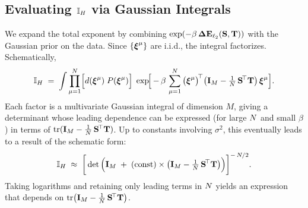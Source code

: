 \documentclass[11pt]{article}
\begin{document}
\subsection{Evaluating \(\mathbb{I}_{H}\) via Gaussian Integrals}
We expand the total exponent by combining \(\exp(-\beta\,\mathbf{\Delta {E}}_{\ell_2}({\mathbf{S}},{\mathbf{T}}))\) with the Gaussian prior on the data. Since \(\{\boldsymbol{\xi}^\mu\}\) are i.i.d., the integral factorizes. Schematically,
\begin{equation}
\mathbb{I}_{H} \;=\;
\int
\prod_{\mu=1}^{N}
\Bigl[
d(\boldsymbol{\xi}^\mu)\;P(\boldsymbol{\xi}^\mu)
\Bigr]\;
\exp\!\Bigl[\, -\,\beta\,\sum_{\mu=1}^{N}\,\bigl(\boldsymbol{\xi}^\mu\bigr)^{\!\top}
\bigl(\mathbf{I}_{M}-\tfrac{1}{N}\,{\mathbf{S}}^{\!\top}{\mathbf{T}}\bigr)
\,\boldsymbol{\xi}^\mu
\Bigr].
\label{eqn:IH_expanded}
\end{equation}
Each factor is a multivariate Gaussian integral of dimension \(M\), giving a determinant whose leading dependence can be expressed (for large \(N\) and small \(\beta\)) in terms of \(\operatorname{tr}(\mathbf{I}_{M}-\tfrac{1}{N}\,{\mathbf{S}}^{\!\top}{\mathbf{T}})\). Up to constants involving \(\sigma^2\), this eventually leads to a result of the schematic form:
\begin{equation}
\mathbb{I}_{H} \;\approx\;
\biggl[\,
\det\,\Bigl(
\mathbf{I}_{M} \;+\;\text{(const)} \times
\bigl(\mathbf{I}_{M}-\tfrac{1}{N}\,{\mathbf{S}}^{\!\top}{\mathbf{T}}\bigr)
\Bigr)
\biggr]^{-\,N/2}.
\label{eqn:IH_schematic_det}
\end{equation}
Taking logarithms and retaining only leading terms in \(N\) yields an expression that depends on
\(\operatorname{tr}\bigl(\mathbf{I}_{M}-\tfrac{1}{N}\,{\mathbf{S}}^{\!\top}{\mathbf{T}}\bigr)\).
\end{document}

